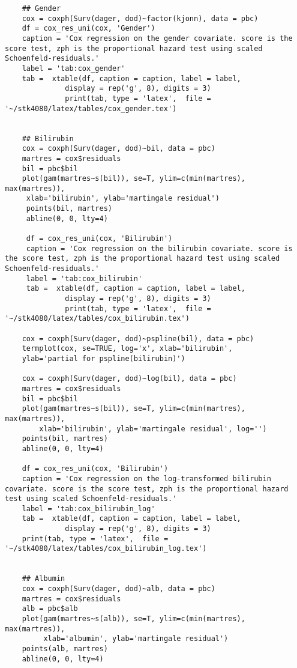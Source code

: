 \documentclass[11pt,a4paper]{article}
\begin{document}
\begin{appendices}
\begin{verbatim}
    ## Gender
    cox = coxph(Surv(dager, dod)~factor(kjonn), data = pbc)
    df = cox_res_uni(cox, 'Gender')
    caption = 'Cox regression on the gender covariate. score is the score test, zph is the proportional hazard test using scaled Schoenfeld-residuals.'
    label = 'tab:cox_gender'
    tab =  xtable(df, caption = caption, label = label, 
              display = rep('g', 8), digits = 3)
              print(tab, type = 'latex',  file = '~/stk4080/latex/tables/cox_gender.tex')


    ## Bilirubin
    cox = coxph(Surv(dager, dod)~bil, data = pbc)
    martres = cox$residuals
    bil = pbc$bil
    plot(gam(martres~s(bil)), se=T, ylim=c(min(martres), max(martres)), 
     xlab='bilirubin', ylab='martingale residual')
     points(bil, martres)
     abline(0, 0, lty=4)

     df = cox_res_uni(cox, 'Bilirubin')
     caption = 'Cox regression on the bilirubin covariate. score is the score test, zph is the proportional hazard test using scaled Schoenfeld-residuals.'
     label = 'tab:cox_bilirubin'
     tab =  xtable(df, caption = caption, label = label, 
              display = rep('g', 8), digits = 3)
              print(tab, type = 'latex',  file = '~/stk4080/latex/tables/cox_bilirubin.tex')

    cox = coxph(Surv(dager, dod)~pspline(bil), data = pbc)
    termplot(cox, se=TRUE, log='x', xlab='bilirubin', 
    ylab='partial for pspline(bilirubin)')

    cox = coxph(Surv(dager, dod)~log(bil), data = pbc)
    martres = cox$residuals
    bil = pbc$bil
    plot(gam(martres~s(bil)), se=T, ylim=c(min(martres), max(martres)), 
        xlab='bilirubin', ylab='martingale residual', log='')
    points(bil, martres)
    abline(0, 0, lty=4)

    df = cox_res_uni(cox, 'Bilirubin')
    caption = 'Cox regression on the log-transformed bilirubin covariate. score is the score test, zph is the proportional hazard test using scaled Schoenfeld-residuals.'
    label = 'tab:cox_bilirubin_log'
    tab =  xtable(df, caption = caption, label = label, 
              display = rep('g', 8), digits = 3)
    print(tab, type = 'latex',  file = '~/stk4080/latex/tables/cox_bilirubin_log.tex')


    ## Albumin
    cox = coxph(Surv(dager, dod)~alb, data = pbc)
    martres = cox$residuals
    alb = pbc$alb
    plot(gam(martres~s(alb)), se=T, ylim=c(min(martres), max(martres)), 
         xlab='albumin', ylab='martingale residual')
    points(alb, martres)
    abline(0, 0, lty=4)
    

\end{verbatim}
\end{appendices}
\end{document}
